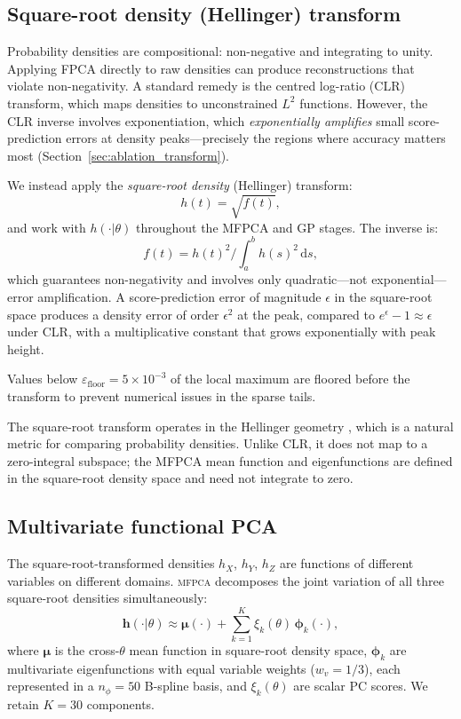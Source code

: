 \documentclass[12pt,a4paper]{article}
\newcommand{\MFPCA}{\textsc{mfpca}}
\newcommand{\spar}{\theta}
\begin{document}
\subsection{Square-root density (Hellinger) transform}
\label{sec:sqrt_transform}

Probability densities are compositional: non-negative and integrating
to unity.  Applying FPCA directly to raw densities can produce
reconstructions that violate non-negativity.  A standard remedy is
the centred log-ratio (CLR) transform, which maps densities to
unconstrained $L^2$ functions.  However, the CLR inverse involves
exponentiation, which \emph{exponentially amplifies} small
score-prediction errors at density peaks---precisely the regions where
accuracy matters most (Section~\ref{sec:ablation_transform}).

We instead apply the \emph{square-root density} (Hellinger) transform:
\begin{equation}
  h(t) = \sqrt{f(t)},
  \label{eq:sqrt_fwd}
\end{equation}
and work with $h(\cdot|\spar)$ throughout the MFPCA and GP stages.
The inverse is:
\begin{equation}
  f(t) = h(t)^2 \Big/ \int_a^b h(s)^2\,\mathrm{d}s,
  \label{eq:sqrt_inv}
\end{equation}
which guarantees non-negativity and involves only quadratic---not
exponential---error amplification.  A score-prediction error of
magnitude $\epsilon$ in the square-root space produces a density error
of order $\epsilon^2$ at the peak, compared to $e^\epsilon-1\approx
\epsilon$ under CLR, with a multiplicative constant that grows
exponentially with peak height.

Values below $\varepsilon_\mathrm{floor} = 5\times10^{-3}$ of the
local maximum are floored before the transform to prevent numerical
issues in the sparse tails.

The square-root transform operates in the Hellinger geometry
\citep{srivastava2007}, which is a natural metric for comparing
probability densities.  Unlike CLR, it does not map to a zero-integral
subspace; the MFPCA mean function and eigenfunctions are defined in
the square-root density space and need not integrate to zero.

\subsection{Multivariate functional PCA}
\label{sec:mfpca}

The square-root-transformed densities $h_X$, $h_Y$, $h_Z$ are
functions of different variables on different domains.  \MFPCA
\citep{happ2018} decomposes the joint variation of all three
square-root densities simultaneously:
\begin{equation}
  \mathbf{h}(\cdot|\spar)
  \approx\boldsymbol{\mu}(\cdot)
  +\sum_{k=1}^{K}\xi_k(\spar)\,\boldsymbol{\phi}_k(\cdot),
  \label{eq:mfpca}
\end{equation}
where $\boldsymbol{\mu}$ is the cross-$\spar$ mean function in
square-root density space, $\boldsymbol{\phi}_k$ are multivariate
eigenfunctions with equal variable weights ($w_v=1/3$), each
represented in a $n_\phi=50$ B-spline basis, and $\xi_k(\spar)$ are
scalar PC scores.  We retain $K=30$ components.
\end{document}
